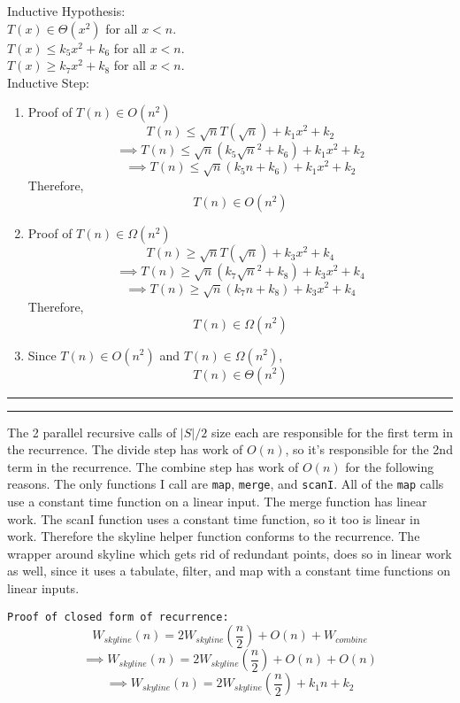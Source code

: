 \documentclass[11pt,letterpaper]{article}
\newcommand{\question}[2] {\vspace{.25in} \hrule\vspace{0.5em}
\noindent{\bf #1: #2} \vspace{0.5em}
\hrule \vspace{.10in}}
\begin{document}
\begin{enumerate}
Inductive Hypothesis:\\
$ T(x) \in \Theta(x^2) $ for all $ x < n $. \\
$ T(x) \leq k_5 x^2 + k_6 $ for all $ x < n $. \\
$ T(x) \geq k_7 x^2 + k_8 $ for all $ x < n $. \\

Inductive Step:\\
\begin{enumerate}
\item
  Proof of $ T(n) \in O(n^2) $
           $$ T(n) \leq \sqrt{n} T(\sqrt{n}) + k_1 x^2 + k_2 $$
  $$ \implies T(n) \leq \sqrt{n} (k_5 \sqrt{n}^2 + k_6) + k_1 x^2 + k_2 $$
  $$ \implies T(n) \leq \sqrt{n} (k_5 n + k_6) + k_1 x^2 + k_2 $$
  Therefore, $$ T(n) \in O(n^2) $$

\item
  Proof of $ T(n) \in \Omega(n^2) $
           $$ T(n) \geq \sqrt{n} T(\sqrt{n}) + k_3 x^2 + k_4 $$
  $$ \implies T(n) \geq \sqrt{n} (k_7 \sqrt{n}^2 + k_8) + k_3 x^2 + k_4 $$
  $$ \implies T(n) \geq \sqrt{n} (k_7 n + k_8) + k_3 x^2 + k_4 $$
  Therefore, $$ T(n) \in \Omega(n^2) $$

\item
  Since $ T(n) \in O(n^2) $ and $ T(n) \in \Omega(n^2) $,
  $$ T(n) \in \Theta(n^2) $$
\end{enumerate}

\end{enumerate}

\question{2}{Task 5.2}
The 2 parallel recursive calls of $|S|/2$ size each are responsible for the 
first term in the recurrence. The divide step has work of $O(n)$, so it's responsible
for the 2nd term in the recurrence. The combine step has work of $O(n)$ for the following
  reasons. The only functions I call are \texttt{map}, \texttt{merge}, and \texttt{scanI}.
  All of the \texttt{map} calls use a constant time function on a linear input. The merge 
  function has linear work. The scanI function uses a constant time function, so it too
  is linear in work. Therefore the skyline helper function conforms to the recurrence.
The wrapper around skyline which gets rid of redundant points, does so in linear work as well,
since it uses a tabulate, filter, and map with a constant time functions on linear inputs.

\texttt{Proof of closed form of recurrence:}\\
$$W_{skyline} (n)= 2 W_{skyline}(\frac{n}{2}) + O(n) + W_{combine}  $$
$$ \implies W_{skyline} (n)= 2 W_{skyline}(\frac{n}{2}) + O(n) + O(n)  $$
$$ \implies W_{skyline} (n)= 2 W_{skyline}(\frac{n}{2}) + k_1 n + k_2  $$
\end{document}
